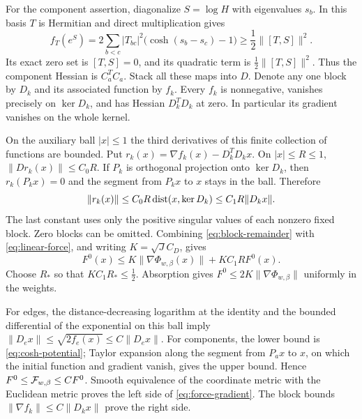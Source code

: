 For the component assertion, diagonalize $S=\log H$ with eigenvalues
$s_b$. In this basis $T$ is Hermitian and direct multiplication gives
\begin{equation}\label{eq:cosh-potential}
 f_T(e^S)=2\sum_{b<c}|T_{bc}|^2
            \bigl(\cosh(s_b-s_c)-1\bigr)
 \ge\frac12\|[T,S]\|^2.
\end{equation}
Its exact zero set is $[T,S]=0$, and its quadratic term is
$\frac12\|[T,S]\|^2$. Thus the component Hessian is $C_a^TC_a$.
Stack all these maps into $D$. Denote any one block by $D_k$ and
its associated function by $f_k$. Every $f_k$ is nonnegative,
vanishes precisely on $\ker D_k$, and has Hessian $D_k^TD_k$ at
zero. In particular its gradient vanishes on the whole kernel.

On the auxiliary ball $|x|\le1$ the third derivatives of this finite
collection of functions are bounded. Put
$r_k(x)=\nabla f_k(x)-D_k^TD_kx$. On $|x|\le R\le1$,
$\|Dr_k(x)\|\le C_0R$. If $P_k$ is orthogonal projection onto
$\ker D_k$, then $r_k(P_kx)=0$ and the segment from $P_kx$ to
$x$ stays in the ball. Therefore
\begin{equation}\label{eq:block-remainder}
 \|r_k(x)\|\le C_0R\operatorname{dist}(x,\ker D_k)
                \le C_1R\|D_kx\|.
\end{equation}
The last constant uses only the positive singular values of each
nonzero fixed block. Zero blocks can be omitted. Combining
\eqref{eq:block-remainder} with \eqref{eq:linear-force}, and writing
$K=\sqrt J C_D$, gives
\[
 F^0(x)\le K\|\nabla\Phi_{w,\beta}(x)\|
                    +KC_1R F^0(x).
\]
Choose $R_*$ so that $KC_1R_*\le\frac12$. Absorption gives
$F^0\le2K\|\nabla\Phi_{w,\beta}\|$ uniformly in the weights.

For edges, the distance-decreasing logarithm at the identity and the
bounded differential of the exponential on this ball imply
$\|D_ex\|\le\sqrt{2f_e(x)}\le C\|D_ex\|$.
For components, the lower bound is \eqref{eq:cosh-potential}; Taylor
expansion along the segment from $P_ax$ to $x$, on which the initial
function and gradient vanish, gives the upper bound. Hence
$F^0\le\mathcal F_{w,\beta}\le CF^0$. Smooth equivalence of the
coordinate metric with the Euclidean metric proves the left side of
\eqref{eq:force-gradient}. The block bounds
$\|\nabla f_k\|\le C\|D_kx\|$ prove the right side.

